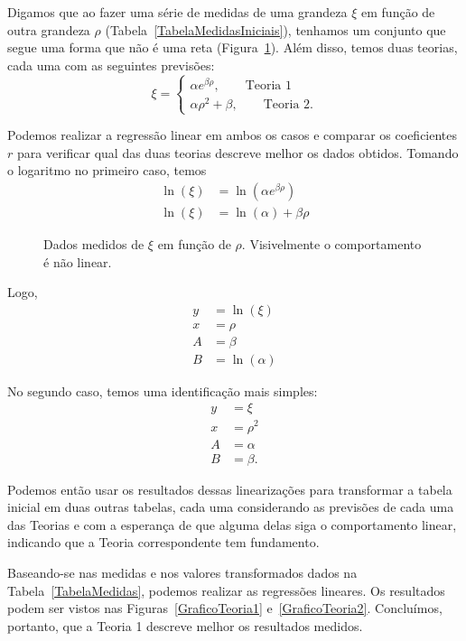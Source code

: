 Digamos que ao fazer uma série de medidas de uma grandeza $\xi$ em função de outra grandeza $\rho$ (Tabela~\ref{TabelaMedidasIniciais}), tenhamos um conjunto que segue uma forma que não é uma reta (Figura~\ref{GraficoMedidas}). Além disso, temos duas teorias, cada uma com as seguintes previsões:
\begin{equation}
	\xi =\begin{cases} \alpha e^{\beta\rho}, \qquad\textrm{Teoria 1} \\
	\alpha\rho^2 + \beta, \qquad\textrm{Teoria 2.} \end{cases}
\end{equation}

\noindent{}Podemos realizar a regressão linear em ambos os casos e comparar os coeficientes $r$ para verificar qual das duas teorias descreve melhor os dados obtidos. Tomando o logaritmo no primeiro caso, temos
\begin{align}
	\ln(\xi) &= \ln(\alpha e^{\beta\rho}) \\
	\ln(\xi) &= \ln(\alpha) + \beta\rho
\end{align}

\begin{figure}
\centering
\caption{Dados medidos de $\xi$ em função de $\rho$. Visivelmente o comportamento é não linear.}
\label{GraficoMedidas}

\end{figure}

\noindent{}Logo,
\begin{align}
	y &= \ln(\xi) \\
	x &= \rho \\
	A &= \beta \\
	B &= \ln(\alpha)
\end{align}

No segundo caso, temos uma identificação mais simples:
\begin{align}
	y &= \xi \\
	x &= \rho^2 \\
	A &= \alpha \\
	B &= \beta.
\end{align}

Podemos então usar os resultados dessas linearizações para transformar a tabela inicial em duas outras tabelas, cada uma considerando as previsões de cada uma das Teorias e com a esperança de que alguma delas siga o comportamento linear, indicando que a Teoria correspondente tem fundamento.

Baseando-se nas medidas e nos valores transformados dados na Tabela~\ref{TabelaMedidas}, podemos realizar as regressões lineares. Os resultados podem ser vistos nas Figuras~\ref{GraficoTeoria1} e~\ref{GraficoTeoria2}. Concluímos, portanto, que a Teoria 1 descreve melhor os resultados medidos.

